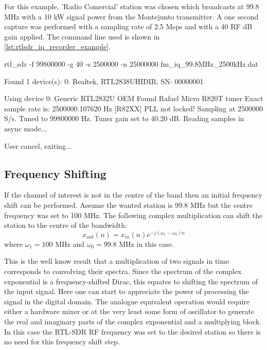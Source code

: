 For this example, 'Radio Comercial' station was chosen which broadcasts at 99.8 MHz with a 10 kW signal power from the Montejunto transmitter. A one second capture was performed with a sampling rate of 2.5 Msps and with a 40 RF dB gain applied. The command line used is shown in \autoref{lst:rtlsdr_iq_recorder_example}.

\begin{bash}[label={lst:rtlsdr_iq_recorder_example},caption={RTL-SDR IQ recorder example}]
rtl_sdr -f 99800000 -g 40 -s 2500000 -n 25000000 fm_iq_99.8MHz_2500kHz.dat

Found 1 device(s):
  0:  Realtek, RTL2838UHIDIR, SN: 00000001

Using device 0: Generic RTL2832U OEM
Found Rafael Micro R820T tuner
Exact sample rate is: 2500000.107620 Hz
[R82XX] PLL not locked!
Sampling at 2500000 S/s.
Tuned to 99800000 Hz.
Tuner gain set to 40.20 dB.
Reading samples in async mode...

User cancel, exiting...
\end{bash}

\subsection{Frequency Shifting}

If the channel of interest is not in the centre of the band then an initial frequency shift can be performed. Assume the wanted station is 99.8 MHz but the centre frequency was set to 100 MHz. The following complex multiplication can shift the station to the centre of the bandwidth:
\begin{equation} \label{eq:fm_signal_shift}
  x_{out}(n) = x_{in}(n)e^{-j(\omega_1 - \omega_0)n}
\end{equation}
where $\omega_1=100$ MHz and $\omega_0=99.8$ MHz in this case.

This is the well know result that a multiplication of two signals in time corresponds to convolving their spectra. Since the spectrum of the complex exponential is a frequency-shifted Dirac, this equates to shifting the spectrum of the input signal. Here one can start to appreciate the power of processing the signal in the digital domain. The analogue equivalent operation would require either a hardware mixer or at the very least some form of oscillator to generate the real and imaginary parts of the complex exponential and a multiplying block. In this case the RTL-SDR RF frequency was set to the desired station so there is no need for this frequency shift step.

